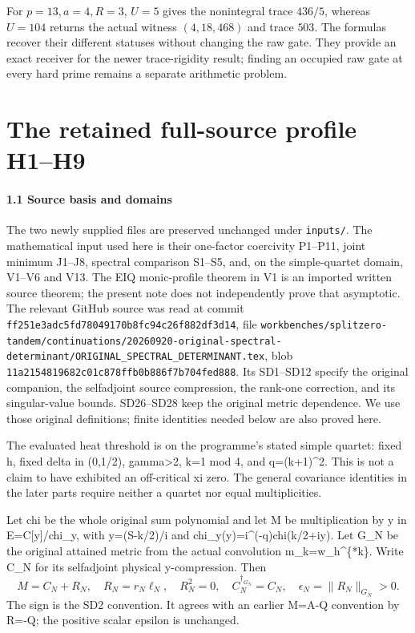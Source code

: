 \documentclass[11pt]{article}
\begin{document}
For \(p=13,a=4,R=3\), \(U=5\) gives the nonintegral trace \(436/5\), whereas \(U=104\) returns the actual witness \((4,18,468)\) and trace \(503\). The formulas recover their different statuses without changing the raw gate. They provide an exact receiver for the newer trace-rigidity result; finding an occupied raw gate at every hard prime remains a separate arithmetic problem.

\clearpage\part{The retained full-source profile H1–H9}
\label{part:13}
\subsection{1.1 Source basis and domains}\label{source-basis-and-domains}

The two newly supplied files are preserved unchanged under \texttt{inputs/}. The mathematical input used here is their one-factor coercivity P1--P11, joint minimum J1--J8, spectral comparison S1--S5, and, on the simple-quartet domain, V1--V6 and V13. The EIQ monic-profile theorem in V1 is an imported written source theorem; the present note does not independently prove that asymptotic. The relevant GitHub source was read at commit \nolinkurl{ff251e3adc5fd78049170b8fc94c26f882df3d14}, file \nolinkurl{workbenches/splitzero-tandem/continuations/20260920-original-spectral-determinant/ORIGINAL_SPECTRAL_DETERMINANT.tex}, blob \nolinkurl{11a2154819682c01c878ffb0b886f7b704fed888}. Its SD1--SD12 specify the original companion, the selfadjoint source compression, the rank-one correction, and its singular-value bounds. SD26--SD28 keep the original metric dependence. We use those original definitions; finite identities needed below are also proved here.

The evaluated heat threshold is on the programme's stated simple quartet: fixed h, fixed delta in (0,1/2), gamma\textgreater2, k=1 mod 4, and q=(k+1)\^{}2. This is not a claim to have exhibited an off-critical xi zero. The general covariance identities in the later parts require neither a quartet nor equal multiplicities.

Let chi be the whole original sum polynomial and let M be multiplication by y in E=C{[}y{]}/chi\_y, with y=(S-k/2)/i and chi\_y(y)=i\^{}(-q)chi(k/2+iy). Let G\_N be the original attained metric from the actual convolution m\_k=w\_h\^{}\{*k\}. Write C\_N for its selfadjoint physical y-compression. Then \[
 M=C_N+R_N,\quad R_N=r_N\ell_N,\quad R_N^2=0,\quad
 C_N^{\dagger_{G_N}}=C_N,\quad \epsilon_N=\|R_N\|_{G_N}>0.
 \tag{H1}
\] The sign is the SD2 convention. It agrees with an earlier M=A-Q convention by R=-Q; the positive scalar epsilon is unchanged.
\end{document}
